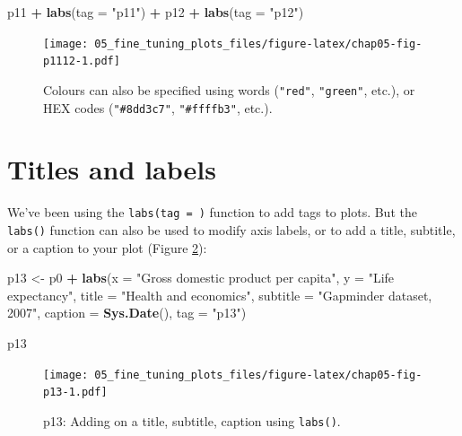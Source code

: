 \documentclass[
  12pt,
  krantz2]{krantz}
\makeatletter
\newenvironment{Shaded}{\begin{snugshade}}{\end{snugshade}}
\newcommand{\DataTypeTok}[1]{\textcolor[rgb]{0.13,0.29,0.53}{#1}}
\newcommand{\KeywordTok}[1]{\textcolor[rgb]{0.13,0.29,0.53}{\textbf{#1}}}
\newcommand{\NormalTok}[1]{#1}
\newcommand{\OperatorTok}[1]{\textcolor[rgb]{0.81,0.36,0.00}{\textbf{#1}}}
\newcommand{\StringTok}[1]{\textcolor[rgb]{0.31,0.60,0.02}{#1}}
\newenvironment{kframe}{%
\medskip{}
\setlength{\fboxsep}{.8em}
 \def\at@end@of@kframe{}%
 \ifinner\ifhmode%
  \def\at@end@of@kframe{\end{minipage}}%
  \begin{minipage}{\columnwidth}%
 \fi\fi%
 \def\FrameCommand##1{\hskip\@totalleftmargin \hskip-\fboxsep
 \colorbox{shadecolor}{##1}\hskip-\fboxsep
     \hskip-\linewidth \hskip-\@totalleftmargin \hskip\columnwidth}%
 \MakeFramed {\advance\hsize-\width
   \@totalleftmargin\z@ \linewidth\hsize
   \@setminipage}}%
 {\par\unskip\endMakeFramed%
 \at@end@of@kframe}
\renewenvironment{Shaded}{\begin{kframe}}{\end{kframe}}
\makeatother
\begin{document}
\begin{Shaded}
\begin{Highlighting}[]
\NormalTok{p11 }\OperatorTok{+}\StringTok{ }\KeywordTok{labs}\NormalTok{(}\DataTypeTok{tag =} \StringTok{"p11"}\NormalTok{) }\OperatorTok{+}\StringTok{ }\NormalTok{p12 }\OperatorTok{+}\StringTok{ }\KeywordTok{labs}\NormalTok{(}\DataTypeTok{tag =} \StringTok{"p12"}\NormalTok{)}
\end{Highlighting}
\end{Shaded}

\begin{figure}
\centering
\texttt{[image: 05\_fine\_tuning\_plots\_files/figure-latex/chap05-fig-p1112-1.pdf]}
\caption{\label{fig:chap05-fig-p1112}Colours can also be specified using words (\texttt{"red"}, \texttt{"green"}, etc.), or HEX codes (\texttt{"\#8dd3c7"}, \texttt{"\#ffffb3"}, etc.).}
\end{figure}

\hypertarget{titles-and-labels}{%
\section{Titles and labels}\label{titles-and-labels}}


We've been using the \texttt{labs(tag\ =\ )} function to add tags to plots.
But the \texttt{labs()} function can also be used to modify axis labels, or to add a title, subtitle, or a caption to your plot (Figure \ref{fig:chap05-fig-p13}):

\begin{Shaded}
\begin{Highlighting}[]
\NormalTok{p13 <-}\StringTok{ }\NormalTok{p0 }\OperatorTok{+}
\StringTok{  }\KeywordTok{labs}\NormalTok{(}\DataTypeTok{x =} \StringTok{"Gross domestic product per capita"}\NormalTok{,}
       \DataTypeTok{y =} \StringTok{"Life expectancy"}\NormalTok{,}
       \DataTypeTok{title =} \StringTok{"Health and economics"}\NormalTok{,}
       \DataTypeTok{subtitle =} \StringTok{"Gapminder dataset, 2007"}\NormalTok{,}
       \DataTypeTok{caption =} \KeywordTok{Sys.Date}\NormalTok{(),}
       \DataTypeTok{tag =} \StringTok{"p13"}\NormalTok{)}

\NormalTok{p13}
\end{Highlighting}
\end{Shaded}

\begin{figure}
\centering
\texttt{[image: 05\_fine\_tuning\_plots\_files/figure-latex/chap05-fig-p13-1.pdf]}
\caption{\label{fig:chap05-fig-p13}p13: Adding on a title, subtitle, caption using \texttt{labs()}.}
\end{figure}
\end{document}
